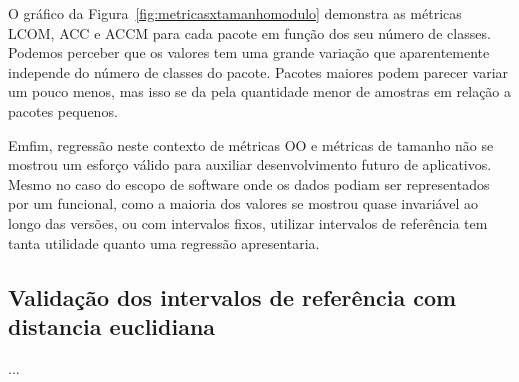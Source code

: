 O gráfico da Figura~\ref{fig:metricasxtamanhomodulo} demonstra as métricas LCOM, ACC e ACCM para cada pacote em função dos seu número de classes. Podemos perceber que os valores tem uma grande variação que aparentemente independe do número de classes do pacote. Pacotes maiores podem parecer variar um pouco menos, mas isso se da pela quantidade menor de amostras em relação a pacotes pequenos.

Emfim, regressão neste contexto de métricas OO e métricas de tamanho não se mostrou um esforço válido para auxiliar desenvolvimento futuro de aplicativos. Mesmo no caso do escopo de software onde os dados podiam ser representados por um funcional, como a maioria dos valores se mostrou quase invariável ao longo das versões, ou com intervalos fixos, utilizar intervalos de referência tem tanta utilidade quanto uma regressão apresentaria. 

\subsection{Validação dos intervalos de referência com distancia euclidiana}

...